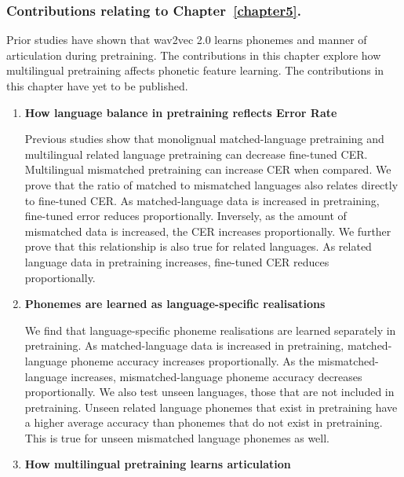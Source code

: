 \subsubsection{Contributions relating to Chapter~\ref{chapter5}.} 

Prior studies have shown that wav2vec 2.0 learns phonemes and manner of articulation during pretraining. The contributions in this chapter explore how multilingual pretraining affects phonetic feature learning. The contributions in this chapter have yet to be published.

\begin{enumerate}
    \item \textbf{How language balance in pretraining reflects Error Rate}

    Previous studies show that monolignual matched-language pretraining and multilingual related language pretraining can decrease fine-tuned CER. Multilingual mismatched pretraining can increase CER when compared. We prove that the ratio of matched to mismatched languages also relates directly to fine-tuned CER. As matched-language data is increased in pretraining, fine-tuned error reduces proportionally. Inversely, as the amount of mismatched data is increased, the CER increases proportionally. We further prove that this relationship is also true for related languages. As related language data in pretraining increases, fine-tuned CER reduces proportionally.

    \newpage
    \item \textbf{Phonemes are learned as language-specific realisations}

    We find that language-specific phoneme realisations are learned separately in pretraining. As matched-language data is increased in pretraining, matched-language phoneme accuracy increases proportionally. As the mismatched-language increases, mismatched-language phoneme accuracy decreases proportionally. We also test unseen languages, those that are not included in pretraining. Unseen related language phonemes that exist in pretraining have a higher average accuracy than phonemes that do not exist in pretraining. This is true for unseen mismatched language phonemes as well.


    \item \textbf{How multilingual pretraining learns articulation}


\end{enumerate}
